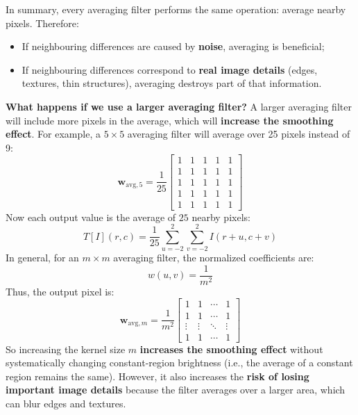 \highspace
In summary, every averaging filter performs the same operation: average nearby pixels. Therefore:
\begin{itemize}
    \item If neighbouring differences are caused by \textbf{noise}, averaging is beneficial;
    \item If neighbouring differences correspond to \textbf{real image details} (edges, textures, thin structures), averaging destroys part of that information.
\end{itemize}

\highspace
\textcolor{Green3}{ \textbf{What happens if we use a larger averaging filter?}} A larger averaging filter will include more pixels in the average, which will \textbf{increase the smoothing effect}. For example, a $5 \times 5$ averaging filter will average over 25 pixels instead of 9:
\begin{equation*}
    \mathbf{w}_{\text{avg},5} = \frac{1}{25} \begin{bmatrix}
        1 & 1 & 1 & 1 & 1 \\
        1 & 1 & 1 & 1 & 1 \\
        1 & 1 & 1 & 1 & 1 \\
        1 & 1 & 1 & 1 & 1 \\
        1 & 1 & 1 & 1 & 1
    \end{bmatrix}
\end{equation*}
Now each output value is the average of $25$ nearby pixels:
\begin{equation*}
    T[I](r,c) = \frac{1}{25} \sum_{u=-2}^{2} \sum_{v=-2}^{2} I(r+u, c+v)
\end{equation*}
In general, for an $m \times m$ averaging filter, the normalized coefficients are:
\begin{equation*}
    w(u,v) = \frac{1}{m^2}
\end{equation*}
Thus, the output pixel is:
\begin{equation*}
    \mathbf{w}_{\text{avg},m} = \frac{1}{m^2} \begin{bmatrix}
        1 & 1 & \cdots & 1 \\
        1 & 1 & \cdots & 1 \\
        \vdots & \vdots & \ddots & \vdots \\
        1 & 1 & \cdots & 1
    \end{bmatrix}
\end{equation*}
So increasing the kernel size $m$ \textbf{increases the smoothing effect} without systematically changing constant-region brightness (i.e., the average of a constant region remains the same). However, it also increases the \textbf{risk of losing important image details} because the filter averages over a larger area, which can blur edges and textures.

